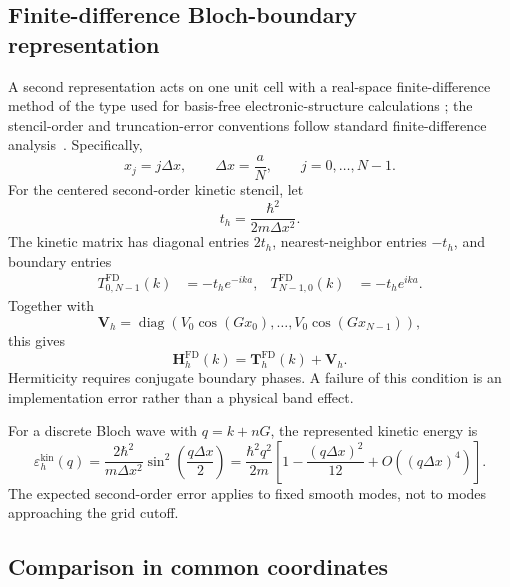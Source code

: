 \subsection{Finite-difference Bloch-boundary representation}

A second representation acts on one unit cell with a real-space finite-difference
method of the type used for basis-free electronic-structure calculations
\cite{chelikowsky1994}; the stencil-order and truncation-error conventions follow
standard finite-difference analysis~\cite{strikwerda2004}. Specifically,
\begin{equation}
    x_j=j\Delta x,
    \qquad
    \Delta x=\frac{a}{N},
    \qquad
    j=0,\ldots,N-1.
\end{equation}
For the centered second-order kinetic stencil, let
\begin{equation}
    t_h=\frac{\hbar^2}{2m\Delta x^2}.
\end{equation}
The kinetic matrix has diagonal entries $2t_h$, nearest-neighbor entries
$-t_h$, and boundary entries
\begin{align}
    T^{\mathrm{FD}}_{0,N-1}(k)&=-t_h e^{-ika},
    &
    T^{\mathrm{FD}}_{N-1,0}(k)&=-t_h e^{ika}.
\end{align}
Together with
\begin{equation}
    \mathbf V_h
    =
    \operatorname{diag}\left(V_0\cos(Gx_0),\ldots,V_0\cos(Gx_{N-1})\right),
\end{equation}
this gives
\begin{equation}
    \mathbf H_h^{\mathrm{FD}}(k)
    =\mathbf T_h^{\mathrm{FD}}(k)+\mathbf V_h.
    \label{eq:periodic-1d-fd-matrix}
\end{equation}
Hermiticity requires conjugate boundary phases. A failure of this condition is
an implementation error rather than a physical band effect.

For a discrete Bloch wave with $q=k+nG$, the represented kinetic energy is
\begin{equation}
    \varepsilon_h^{\mathrm{kin}}(q)
    =
    \frac{2\hbar^2}{m\Delta x^2}
    \sin^2\left(\frac{q\Delta x}{2}\right)
    =
    \frac{\hbar^2q^2}{2m}
    \left[1-\frac{(q\Delta x)^2}{12}
    +O\!\left((q\Delta x)^4\right)\right].
    \label{eq:periodic-1d-fd-dispersion}
\end{equation}
The expected second-order error applies to fixed smooth modes, not to modes
approaching the grid cutoff.

\subsection{Comparison in common coordinates}

